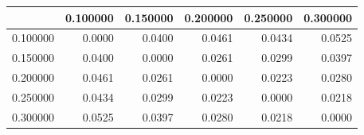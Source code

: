 \begin{tabular}{lrrrrr}
\toprule
 & 0.100000 & 0.150000 & 0.200000 & 0.250000 & 0.300000 \\
\midrule
0.100000 & 0.0000 & 0.0400 & 0.0461 & 0.0434 & 0.0525 \\
0.150000 & 0.0400 & 0.0000 & 0.0261 & 0.0299 & 0.0397 \\
0.200000 & 0.0461 & 0.0261 & 0.0000 & 0.0223 & 0.0280 \\
0.250000 & 0.0434 & 0.0299 & 0.0223 & 0.0000 & 0.0218 \\
0.300000 & 0.0525 & 0.0397 & 0.0280 & 0.0218 & 0.0000 \\
\bottomrule
\end{tabular}
